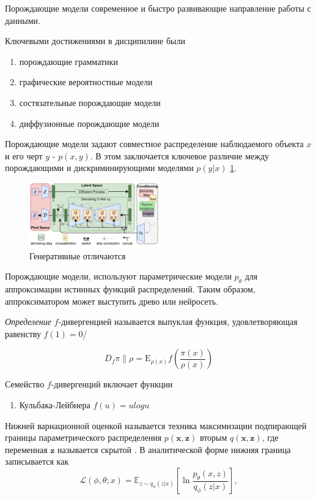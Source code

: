 
Порождающие модели современное и быстро развивающие направление работы с данными.

Ключевыми достижениями в дисципилине были \begin{enumerate}
    \item порождающие грамматики \cite{chomsky2002syntactic}
    \item графические вероятностные модели \cite{pearl1988probabilistic}
    \item состязательные порождающие модели \cite{goodfellow2020generative}
    \item диффузионные порождающие модели \cite{song2020score}
\end{enumerate}

Порождающие модели задают совместное распределение наблюдаемого объекта $x$ и его черт $y$ -  $p(x,y)$. В этом заключается 
ключевое различие между порождающими и дискриминирующими моделями $p(y|x)$ \ref{discr_vs_gen}.

\begin{figure}[h]
    \centering
    \includegraphics[width=0.5\textwidth]{assets/ml/generation/stable_diffusion.png}
    \caption{Генеративные отличаются}
    \label{discr_vs_gen}
\end{figure}


Порождающие модели, используют параметрические модели $p_\theta$ для аппроксимации истинных функций распределений. Таким образом, аппроксиматором может выступить
древо или нейросеть.

\textit{Определение} $f$-дивергенцией называется выпуклая функция, удовлетворяющая равенству $f(1)=0$/

$$
    D_f{\pi \parallel \rho} = \mathrm E_{\rho(x)} f\left(\frac{\pi(x)}{\rho(x)}\right)
$$

Семейство $f$-дивергенций включает функции \begin{enumerate}
    \item Кульбака-Лейбнера $f(u)=u logu $
\end{enumerate}


Нижней вариационной оценкой называется техника максимизации подпирающей границы параметрического распределения $p(\mathbf{x},\mathbf{z})$ вторым $q(\mathbf{x},\mathbf{z})$,
где переменная $\mathbf{z}$ называется скрытой . В аналитической форме нижняя граница записывается как 
$$
    \mathcal{L}(\phi,\theta;x) = \mathbb{E}_{z \sim q_\phi(z|x)} \left[\ln \frac{p_{\theta}(x,z)}{q_{\phi}(z|x)}\right],
$$

